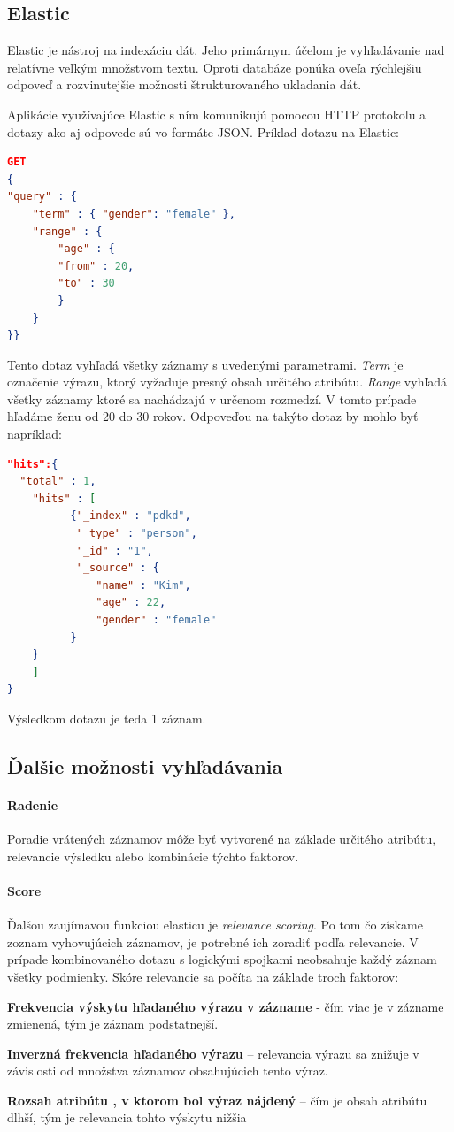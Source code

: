 \documentclass[
  digital, %
  table,   %
  lof,     %
  lot,     %
]{fithesis3}
\begin{document}
\subsection{Elastic}
Elastic je nástroj na indexáciu dát. Jeho primárnym účelom je vyhľadávanie nad relatívne veľkým množstvom textu. Oproti databáze ponúka oveľa rýchlejšiu odpoveď a rozvinutejšie možnosti štrukturovaného ukladania dát. 

Aplikácie využívajúce Elastic s ním komunikujú pomocou HTTP protokolu a dotazy ako  aj odpovede sú vo formáte JSON. Príklad dotazu na Elastic:


\begin{lstlisting}[language=json,firstnumber=1]
GET
{
"query" : {
	"term" : { "gender": "female" },
	"range" : {
		"age" : {
		"from" : 20,
		"to" : 30
		}
	} 
}}
	\end{lstlisting}
Tento dotaz vyhľadá všetky záznamy s uvedenými parametrami. \textit{Term} je označenie výrazu, ktorý vyžaduje presný obsah určitého atribútu. \textit{Range} vyhľadá všetky záznamy ktoré sa nachádzajú v určenom rozmedzí. V tomto prípade hľadáme ženu od 20 do 30 rokov. Odpoveďou na takýto dotaz by mohlo byť napríklad:
\begin{lstlisting}[language=json,firstnumber=1]
"hits":{
  "total" : 1, 
	"hits" : [
		  {"_index" : "pdkd",
		   "_type" : "person",
		   "_id" : "1",
		   "_source" : { 
			  "name" : "Kim", 
			  "age" : 22,
			  "gender" : "female" 
		  }
	} 
	]
}
\end{lstlisting}
Výsledkom dotazu je teda 1 záznam. 
\subsection{Ďalšie možnosti vyhľadávania}							
\paragraph{Radenie}
Poradie vrátených záznamov môže byť vytvorené na základe určitého atribútu, relevancie výsledku alebo kombinácie týchto faktorov.
\paragraph{Score}
Ďalšou zaujímavou funkciou elasticu je \textit{relevance scoring}. Po tom čo získame zoznam vyhovujúcich záznamov, je potrebné ich zoradiť podľa relevancie. V prípade kombinovaného dotazu s logickými spojkami neobsahuje každý záznam všetky podmienky. Skóre relevancie sa počíta na základe troch faktorov:
\begin{compactenum}
	\item \textbf{Frekvencia výskytu hľadaného výrazu v zázname} - čím viac je v zázname zmienená, tým je záznam podstatnejší.
	\item \textbf{Inverzná frekvencia hľadaného výrazu} – relevancia výrazu sa znižuje v závislosti od množstva záznamov obsahujúcich tento výraz.
	\item \textbf{Rozsah atribútu , v ktorom bol výraz nájdený} – čím je obsah atribútu dlhší, tým je relevancia tohto výskytu nižšia
\end{compactenum}
\end{document}
